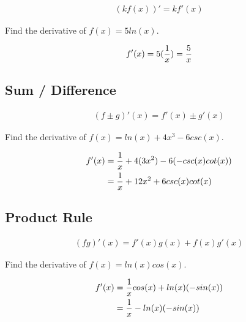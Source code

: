 \begin{theorem}
    \begin{align}
        (kf(x))' = kf'(x)
    \end{align}
\end{theorem}

\begin{exercise}\nonumber
    Find the derivative of $ f(x) = 5ln(x) $.

    $$
        f'(x) = 5({1 \over x}) = {5 \over x}
    $$
\end{exercise}

\subsection{Sum / Difference}

\begin{theorem}
    \begin{align}
        (f \pm g)'(x) = f'(x) \pm g'(x)
    \end{align}
\end{theorem}

\begin{exercise}\nonumber
    Find the derivative of $ f(x) = ln(x) + 4x^3 - 6csc(x) $.

    \begin{align}
        f'(x) & = {1 \over x} + 4(3x^2) - 6(-csc(x)cot(x)) \\
              & = {1 \over x} + 12x^2 + 6csc(x)cot(x)
    \end{align}
\end{exercise}

\subsection{Product Rule}

\begin{theorem}
    \begin{align}
        (fg)'(x) = f'(x)g(x) + f(x)g'(x)
    \end{align}
\end{theorem}

\begin{exercise}\nonumber
    Find the derivative of $ f(x) = ln(x)cos(x) $.

    \begin{align}
        f'(x) & = {1 \over x}cos(x) + ln(x)(-sin(x)) \\
              & = {1 \over x} - ln(x)(-sin(x))
    \end{align}
\end{exercise}

